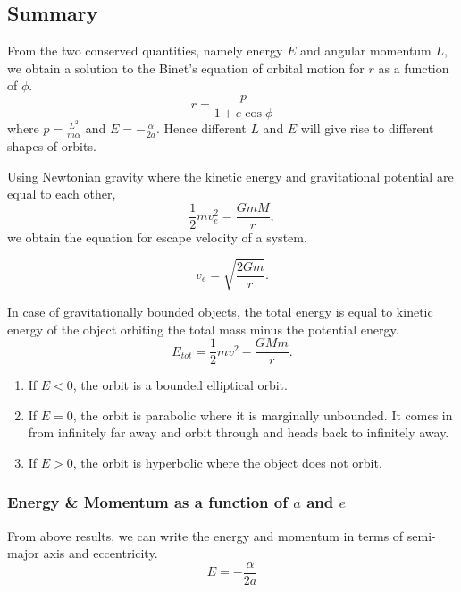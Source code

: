 \documentclass{article}
\begin{document}
\subsection{Summary}
From the two conserved quantities, namely energy $E$ and angular momentum $L$, we obtain a solution to the Binet's equation of orbital motion 
for $r$ as a function of $\phi$.
\begin{equation}
    r = \frac{p}{1+e \cos{\phi}}
\end{equation}
where $p = \frac{L^2}{m\alpha}$ and $E = -\frac{\alpha}{2a}$. Hence different $L$ and $E$ will give rise to different shapes of orbits.

Using Newtonian gravity where the kinetic energy and gravitational potential are equal to each other,
\begin{equation}
    \frac{1}{2} m v_e^2 = \frac{GmM}{r},
\end{equation}
we obtain the equation for escape velocity of a system.

\begin{equation}
    v_e = \sqrt{\frac{2Gm}{r}}.
\end{equation}

In case of gravitationally bounded objects, the total energy is equal to kinetic energy of the object orbiting the total mass
minus the potential energy.
\begin{equation}
    E_{\textit{tot}} = \frac{1}{2}mv^2 - \frac{GMm}{r}.
\end{equation}

\begin{enumerate}
    \item If $E <0 $, the orbit is a bounded elliptical orbit.
    \item If $E = 0$, the orbit is parabolic where it is marginally unbounded. It comes in from infinitely far away and orbit through
    and heads back to infinitely away.
    \item If $E > 0$, the orbit is hyperbolic where the object does not orbit.
\end{enumerate}

\subsubsection{Energy \& Momentum as a function of $a$ and $e$}
From above results, we can write the energy and momentum in terms of semi-major axis and eccentricity.
\begin{equation}
    E = -\frac{\alpha}{2a}
\end{equation}
\end{document}
